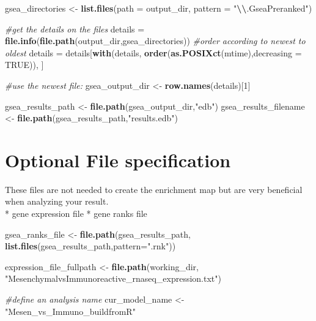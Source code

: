 \documentclass[
]{book}
\newenvironment{Shaded}{\begin{snugshade}}{\end{snugshade}}
\newcommand{\AttributeTok}[1]{\textcolor[rgb]{0.13,0.29,0.53}{#1}}
\newcommand{\CommentTok}[1]{\textcolor[rgb]{0.56,0.35,0.01}{\textit{#1}}}
\newcommand{\ConstantTok}[1]{\textcolor[rgb]{0.56,0.35,0.01}{#1}}
\newcommand{\DecValTok}[1]{\textcolor[rgb]{0.00,0.00,0.81}{#1}}
\newcommand{\FunctionTok}[1]{\textcolor[rgb]{0.13,0.29,0.53}{\textbf{#1}}}
\newcommand{\NormalTok}[1]{#1}
\newcommand{\OtherTok}[1]{\textcolor[rgb]{0.56,0.35,0.01}{#1}}
\newcommand{\SpecialCharTok}[1]{\textcolor[rgb]{0.81,0.36,0.00}{\textbf{#1}}}
\newcommand{\StringTok}[1]{\textcolor[rgb]{0.31,0.60,0.02}{#1}}
\begin{document}
\begin{Shaded}
\begin{Highlighting}[]
\NormalTok{gsea\_directories }\OtherTok{\textless{}{-}} \FunctionTok{list.files}\NormalTok{(}\AttributeTok{path =}\NormalTok{ output\_dir, }\AttributeTok{pattern =} \StringTok{"}\SpecialCharTok{\textbackslash{}\textbackslash{}}\StringTok{.GseaPreranked"}\NormalTok{)}

\CommentTok{\#get the details on the files}
\NormalTok{details }\OtherTok{=} \FunctionTok{file.info}\NormalTok{(}\FunctionTok{file.path}\NormalTok{(output\_dir,gsea\_directories))}
\CommentTok{\#order according to newest to oldest}
\NormalTok{details }\OtherTok{=}\NormalTok{ details[}\FunctionTok{with}\NormalTok{(details, }\FunctionTok{order}\NormalTok{(}\FunctionTok{as.POSIXct}\NormalTok{(mtime),}\AttributeTok{decreasing =} \ConstantTok{TRUE}\NormalTok{)), ]}

\CommentTok{\#use the newest file:}
\NormalTok{gsea\_output\_dir }\OtherTok{\textless{}{-}} \FunctionTok{row.names}\NormalTok{(details)[}\DecValTok{1}\NormalTok{]}

\NormalTok{gsea\_results\_path }\OtherTok{\textless{}{-}} \FunctionTok{file.path}\NormalTok{(gsea\_output\_dir,}\StringTok{"edb"}\NormalTok{)}
\NormalTok{gsea\_results\_filename }\OtherTok{\textless{}{-}} \FunctionTok{file.path}\NormalTok{(gsea\_results\_path,}\StringTok{"results.edb"}\NormalTok{)}
\end{Highlighting}
\end{Shaded}

\hypertarget{optional-file-specification}{%
\section{Optional File specification}\label{optional-file-specification}}

These files are not needed to create the enrichment map but are very beneficial when analyzing your result.\\
* gene expression file
* gene ranks file

\begin{Shaded}
\begin{Highlighting}[]
\NormalTok{gsea\_ranks\_file }\OtherTok{\textless{}{-}} \FunctionTok{file.path}\NormalTok{(gsea\_results\_path,}
                             \FunctionTok{list.files}\NormalTok{(gsea\_results\_path,}\AttributeTok{pattern=}\StringTok{".rnk"}\NormalTok{))}

\NormalTok{expression\_file\_fullpath }\OtherTok{\textless{}{-}} \FunctionTok{file.path}\NormalTok{(working\_dir,}
                          \StringTok{"MesenchymalvsImmunoreactive\_rnaseq\_expression.txt"}\NormalTok{)}

\CommentTok{\#define an analysis name}
\NormalTok{cur\_model\_name }\OtherTok{\textless{}{-}} \StringTok{"Mesen\_vs\_Immuno\_buildfromR"}
\end{Highlighting}
\end{Shaded}
\end{document}

